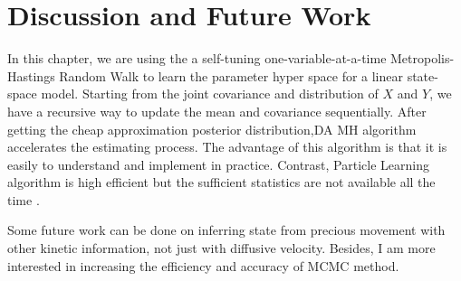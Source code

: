 \section{Discussion and Future Work}

In this chapter, we are using the a self-tuning one-variable-at-a-time Metropolis-Hastings Random Walk to learn the parameter hyper space for a linear state-space model.  Starting from the joint covariance and distribution of $X$ and $Y$, we have a recursive way to update the mean and covariance sequentially. After getting the cheap approximation posterior distribution,DA MH algorithm accelerates the estimating process. The advantage of this algorithm is that it is easily to understand and implement in practice. Contrast, Particle Learning algorithm is high efficient but the sufficient statistics are not available all the time . 

Some future work can be done on inferring state from precious movement with other kinetic information, not just with diffusive  velocity. Besides, I am more interested in increasing the efficiency and accuracy of MCMC method. 

